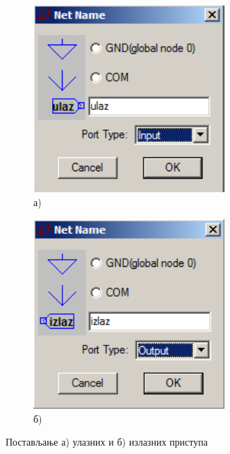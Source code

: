 \begin{figure}[h]
\centering
\begin{subfigure}{0.49\textwidth}
\centering
\includegraphics[width=0.8\textwidth]{figs/rc-symbol1a.PNG}
\caption*{а)}
\end{subfigure}
\begin{subfigure}{0.49\textwidth}
\centering
\includegraphics[width=0.8\textwidth]{figs/rc-symbol1b.PNG}
\caption*{б)}
\end{subfigure}
\caption{Постављање а) улазних и б) излазних приступа}
\label{Fig:rc-symbol1}
\end{figure}


